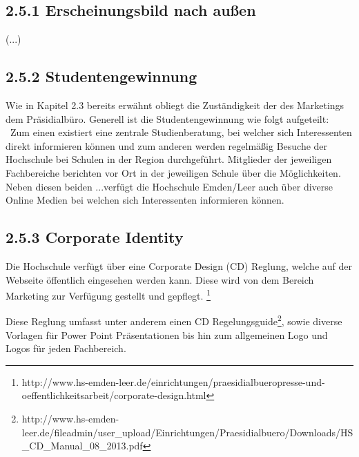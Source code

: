 \documentclass[a4paper]{article}
\begin{document}
\subsection[2.5.1 Erscheinungsbild nach außen]{\bfseries 2.5.1 Erscheinungsbild nach außen}
{\sffamily\mdseries\color{black}
(...)}

\subsection[2.5.2 Studentengewinnung]{\bfseries\color{black} 2.5.2 Studentengewinnung}
{\sffamily\mdseries\color{black}
Wie in Kapitel 2.3 bereits erwähnt obliegt die Zuständigkeit der des Marketings dem Präsidialbüro. Generell ist die
Studentengewinnung wie folgt aufgeteilt: \ Zum einen existiert eine zentrale Studienberatung, bei welcher sich
Interessenten direkt informieren können und zum anderen werden regelmäßig Besuche der Hochschule bei Schulen in der
Region durchgeführt. Mitglieder der jeweiligen Fachbereiche berichten vor Ort in der jeweiligen Schule über die
Möglichkeiten. Neben diesen beiden ...verfügt die Hochschule Emden/Leer auch über diverse Online Medien bei welchen
sich Interessenten informieren können. }

\subsection[2.5.3 Corporate Identity]{\bfseries 2.5.3 Corporate Identity}
{\sffamily\mdseries\color{black}
Die Hochschule verfügt über eine Corporate Design (CD) Reglung, welche auf der Webseite öffentlich eingesehen werden
kann. Diese wird von dem Bereich Marketing zur Verfügung gestellt und gepflegt.
\footnote{http://www.hs-emden-leer.de/einrichtungen/praesidialbueropresse-und-oeffentlichkeitsarbeit/corporate-design.html}
}

{\sffamily\mdseries\color{black}
Diese Reglung umfasst unter anderem einen CD
Regelungsguide\footnote{http://www.hs-emden-leer.de/fileadmin/user\_upload/Einrichtungen/Praesidialbuero/Downloads/HS\_CD\_Manual\_08\_2013.pdf},
sowie diverse Vorlagen für Power Point Präsentationen bis hin zum allgemeinen Logo und Logos für jeden Fachbereich.}
\end{document}
